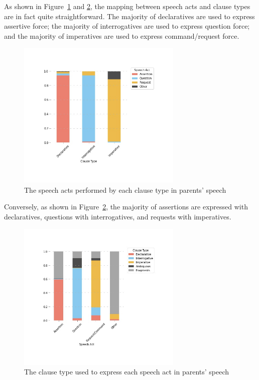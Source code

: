 As shown in Figure~\ref{fig:real-clsp} and \ref{fig:real-spcl}, the mapping between speech acts and clause types are in fact quite straightforward. The majority of declaratives are used to express assertive force; the majority of interrogatives are used to express question force; and the majority of imperatives are used to express command/request force. 

\begin{figure}[H]
    \centering
    \includegraphics[width=0.7\textwidth]{figures/real-clsp.jpg}
    \caption{The speech acts performed by each clause type in parents' speech}
    \label{fig:real-clsp}
\end{figure}

Conversely, as shown in Figure~\ref{fig:real-spcl}, the majority of assertions are expressed with declaratives, questions with interrogatives, and requests with imperatives.

\begin{figure}[H]
    \centering
    \includegraphics[width=0.7\textwidth]{figures/real-spcl.jpg}
    \caption{The clause type used to express each speech act in parents' speech}
    \label{fig:real-spcl}
\end{figure}


